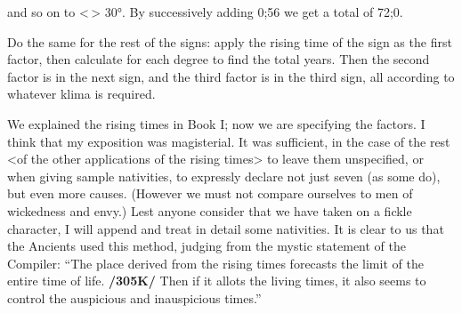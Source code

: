 and so on to <\Gemini\,> 30°. By successively adding 0;56 we get a total of 72;0.

Do the same for the rest of the signs: apply the rising time of the sign as the first factor, then calculate for each degree to find the total years. Then the second factor is in the next sign, and the third factor is in
the third sign, all according to whatever klima is required.

We explained the rising times in Book I; now we are specifying the factors. I think that my exposition was magisterial. It was sufficient, in the case of the rest <of the other applications of the rising
times> to leave them unspecified, or when giving sample nativities, to expressly declare not just seven (as some do), but even more causes. (However we must not compare ourselves to men of wickedness and envy.) Lest anyone consider that we have taken on a fickle character, I will append and treat in detail some nativities. It is clear to us that the Ancients used this method, judging from the mystic statement of the Compiler: “The place derived from the rising times forecasts the limit of the entire time of life. \textbf{/305K/} Then if it allots the living times, it also seems to control the auspicious and inauspicious times.”

\newpage